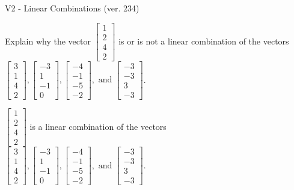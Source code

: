 \begin{exercise}
  \begin{exerciseTitle}V2 - Linear Combinations (ver. 234)\end{exerciseTitle}
  \begin{exerciseStatement}
    Explain why the vector \(\left[\begin{array}{c}
1 \\
2 \\
4 \\
2
\end{array}\right]\)  is or is not a linear 
	combination of the vectors \(\left[\begin{array}{c}
3 \\
1 \\
4 \\
2
\end{array}\right] , \left[\begin{array}{c}
-3 \\
1 \\
-1 \\
0
\end{array}\right] , \left[\begin{array}{c}
-4 \\
-1 \\
-5 \\
-2
\end{array}\right] , \text{ and } \left[\begin{array}{c}
-3 \\
-3 \\
3 \\
-3
\end{array}\right]\).
	


  \end{exerciseStatement}
  \begin{exerciseAnswer}
   \(\left[\begin{array}{c}
1 \\
2 \\
4 \\
2
\end{array}\right]\) 
  	 is  
	a linear combination of the vectors \(\left[\begin{array}{c}
3 \\
1 \\
4 \\
2
\end{array}\right] , \left[\begin{array}{c}
-3 \\
1 \\
-1 \\
0
\end{array}\right] , \left[\begin{array}{c}
-4 \\
-1 \\
-5 \\
-2
\end{array}\right] , \text{ and } \left[\begin{array}{c}
-3 \\
-3 \\
3 \\
-3
\end{array}\right]\).


\end{exerciseAnswer}
\end{exercise}
